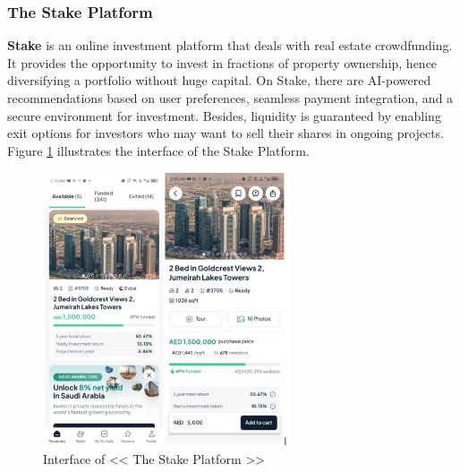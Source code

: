 
\subsubsection{The Stake Platform}

\textbf{\textcolor{primary}{Stake}} \cite{StakeWebsite} is an online investment platform that deals with real estate crowdfunding. It provides the opportunity to invest in fractions of property ownership, hence diversifying a portfolio without huge capital. On Stake, there are AI-powered recommendations based on user preferences, seamless payment integration, and a secure environment for investment. Besides, liquidity is guaranteed by enabling exit options for investors who may want to sell their shares in ongoing projects. Figure \ref{fig:stake-platform} illustrates the interface of the Stake Platform.

\newpage
\thispagestyle{empty}
\newpage

\begin{figure}[htbp]
    \centering
    \includegraphics[width=0.65\textwidth]{images/Interface-of-the Stake Platform.png}
    \caption{Interface of << The Stake Platform >>}
    \label{fig:stake-platform}
\end{figure}

